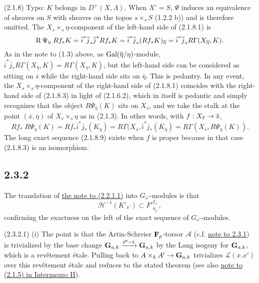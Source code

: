 \documentclass[deligne.tex]{subfiles}
\begin{document}
(2.1.8)
Typo: $K$ belongs in $D^+(X,\Lambda)$.
When $X'=S$, $\Psi$ induces an equivalence of sheaves on $S$ with sheaves
on the topos $s\times_s S$ (1.2.2 b)) and is therefore omitted.
The $X_s\times_s\eta$-component of the left-hand side of (2.1.8.1) is
\begin{equation*}
	\operatorname{R}\Psi_\eta\;Rf_*K=\overline i^*\overline j_*\overline j^*Rf_*K
	=\overline i^*\overline j_*(Rf_*K)_{\overline\eta}
	=\overline i^*\overline j_*R\Gamma(X_{\overline\eta},K).
\end{equation*}
As in the note to (1.3) above, as $\operatorname{Gal}(\overline\eta/\eta)$-module,
$\overline i^*\overline j_*R\Gamma(X_{\overline\eta},K)
=R\Gamma(X_{\overline\eta},K)$, but the left-hand side can be considered
as sitting on $\overline s$ while the right-hand side sits on
$\overline\eta$. This is pedantry.
In any event, the $X_s\times_s\eta$-component of the right-hand side of
(2.1.8.1) coincides with the right-hand side of (2.1.8.3) in light of
(2.1.6.2), which in itself is pedantic and simply recognizes that the 
object $R\Psi_{\overline\eta}(K)$ sits on $X_{\overline s}$, and we take
the stalk at the point $(\overline x,\overline\eta)$ of $X_s\times_s\eta$
as in (2.1.3). In other words, with $f:X_{\overline s}\rightarrow\overline s$,
\begin{equation*}
	Rf_*\;R\Psi_{\eta}(K)
	=Rf_*\overline i^*\overline j_*(K_{\overline\eta})
	=R\Gamma(X_{\overline s},\overline i^*\overline j_*(K_{\overline\eta})
	=R\Gamma(X_{\overline s},R\Psi_{\overline\eta}(K)).
\end{equation*}
The long exact sequence (2.1.8.9) exists when $f$ is proper because in that
case (2.1.8.3) is an isomorphism.

\subsection*{2.3.2}
The translation of \hyperref[laumon:2.2.1]{the note to (2.2.1.1)} into
$G_{s'}$-modules is that
\begin{equation*}
	\mathscr H^{-1}(K'_{\overline s'})\subset
	F'^{I_{s'}}_{\overline\eta_{s'}},
\end{equation*}
confirming the exactness on the left of the exact sequence of
$G_{s'}$-modules.

(2.3.2.1)
(i) The point is that the Artin-Schreier $\mathbf{F}_p$-torsor $\mathcal A$
(c.f. \hyperref[laumon:2.3.1]{note to 2.3.1}) is trivialized by
the base change $\mathbf{G}_{a,k}\xrightarrow{t^p-t}\mathbf{G}_{a,k}$ by the Lang isogeny for
$\mathbf{G}_{a,k}$, which is a revêtement étale.
Pulling back to $A\times_k A'\rightarrow\mathbf{G}_{a,k}$ trivializes $\mathscr L(x.x')$
over this revêtement étale and reduces to the stated theorem
(see also \hyperref[sga7:XIII]{note to (2.1.5) in Intermezzo II}).
\end{document}
